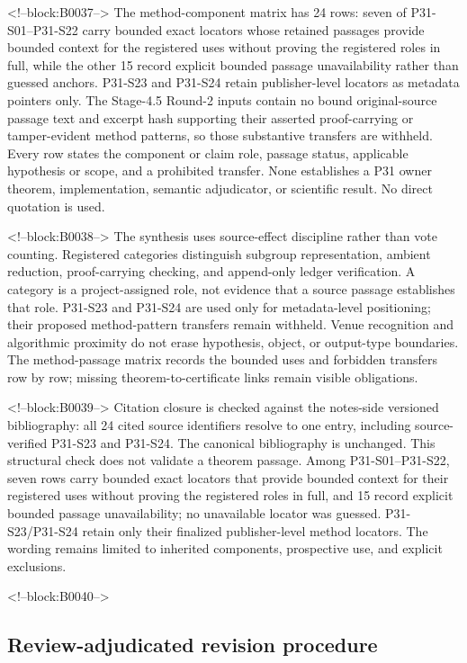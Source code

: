 \documentclass[11pt]{article}
\begin{document}
<!--block:B0037-->
The method-component matrix has 24 rows: seven of P31-S01--P31-S22
carry bounded exact locators whose retained passages provide bounded context for
the registered uses without proving the registered roles in full, while the other
15 record explicit bounded passage unavailability rather than guessed anchors.
P31-S23 and P31-S24 retain publisher-level locators as metadata pointers only.
The Stage-4.5 Round-2 inputs contain no bound original-source passage text and
excerpt hash supporting their asserted proof-carrying or tamper-evident method
patterns, so those substantive transfers are withheld. Every row states the
component or claim role, passage status, applicable hypothesis or scope, and a
prohibited transfer. None establishes a P31 owner theorem, implementation,
semantic adjudicator, or scientific result. No direct quotation is used.

<!--block:B0038-->
The synthesis uses source-effect discipline rather than vote counting.
Registered categories distinguish subgroup representation, ambient reduction,
proof-carrying checking, and append-only ledger verification. A category is a
project-assigned role, not evidence that a source passage establishes that role.
P31-S23 and P31-S24 are used only for metadata-level positioning; their proposed
method-pattern transfers remain withheld. Venue recognition and algorithmic
proximity do not erase hypothesis, object, or output-type boundaries. The
method-passage matrix records the bounded uses and forbidden transfers row by
row; missing theorem-to-certificate links remain visible obligations.

<!--block:B0039-->
Citation closure is checked against the notes-side versioned bibliography: all
24 cited source identifiers resolve to one entry, including source-verified
P31-S23 and P31-S24. The canonical bibliography is unchanged. This structural
check does not validate a theorem passage. Among P31-S01--P31-S22, seven rows
carry bounded exact locators that provide bounded context for their registered
uses without proving the registered roles in full, and 15 record explicit bounded
passage unavailability; no unavailable locator was guessed.
P31-S23/P31-S24 retain only their finalized publisher-level method locators. The
wording remains limited to inherited components, prospective use, and explicit
exclusions.

<!--block:B0040-->
\hypertarget{32-review-adjudicated-revision-procedure}{%
\subsection{Review-adjudicated revision
procedure}\label{32-review-adjudicated-revision-procedure}}
\end{document}
